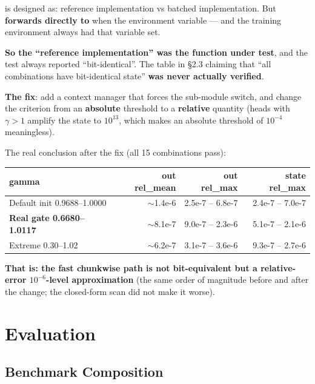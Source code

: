  is designed as: reference implementation vs batched
implementation. But  \textbf{forwards directly to
} when the environment variable  ---
and the training environment always had that variable set.

\textbf{So the ``reference implementation'' was the function under test}, and the test always
reported ``bit-identical''. The table in  \S2.3 claiming that ``all combinations
have bit-identical state'' \textbf{was never actually verified}.

\textbf{The fix}: add a  context manager that forces the sub-module
switch, and change the criterion from an \textbf{absolute} threshold to a \textbf{relative}
quantity (heads with $\gamma > 1$ amplify the state to $10^{13}$, which makes an absolute
threshold of $10^{-4}$ meaningless).

The real conclusion after the fix (all 15 combinations pass):

\begin{center}\small
\begin{tabular}{@{}>{\RaggedRight\arraybackslash}p{}rrr@{}}
\toprule
\textbf{gamma} & \textbf{out rel\_mean} & \textbf{out rel\_max} & \textbf{state rel\_max} \\
\midrule
Default init 0.9688--1.0000 & $\sim$1.4e-6 & 2.5e-7 -- 6.8e-7 & 2.4e-7 -- 7.0e-7 \\
\textbf{Real gate 0.6680--1.0117} & $\sim$8.1e-7 & 9.0e-7 -- 2.3e-6 & 5.1e-7 -- 2.1e-6 \\
Extreme 0.30--1.02 & $\sim$6.2e-7 & 3.1e-7 -- 3.6e-6 & 9.3e-7 -- 2.7e-6 \\
\bottomrule
\end{tabular}
\end{center}

\textbf{That is: the fast chunkwise path is not bit-equivalent but a relative-error
$10^{-6}$-level approximation} (the same order of magnitude before and after the change; the
closed-form scan did not make it worse).

\section{Evaluation}
\label{sec:en-eval}

\subsection{Benchmark Composition}
\label{sec:en-eval-bench}

